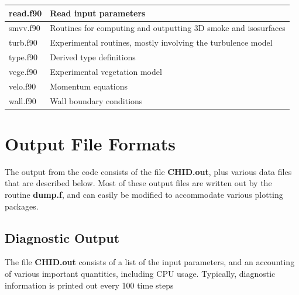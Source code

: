 \documentclass[11pt]{book}
\begin{document}
\begin{table}[ht]
\begin{center}
\begin{tabular}{|l|l|}
read.f90   & Read input parameters \\ \hline
smvv.f90   & Routines for computing and outputting 3D smoke and isosurfaces \\ \hline
turb.f90   & Experimental routines, mostly involving the turbulence model \\ \hline
type.f90   & Derived type definitions \\ \hline
vege.f90   & Experimental vegetation model \\ \hline
velo.f90   & Momentum equations \\ \hline
wall.f90   & Wall boundary conditions \\ \hline
\end{tabular}
\end{center}
\end{table}





\chapter{Output File Formats}

The output from the code consists of the file {\bf CHID.out}, plus various
data files that are described below.
Most of these output files are written out by the routine {\bf dump.f},
and can easily be modified to accommodate various plotting packages.

\section{Diagnostic Output}%

\label{out:file}

The file {\bf CHID.out} consists of a list of the input
parameters, and an accounting of various important quantities, including
CPU usage. Typically, diagnostic information is printed out every
100 time steps
\end{document}
